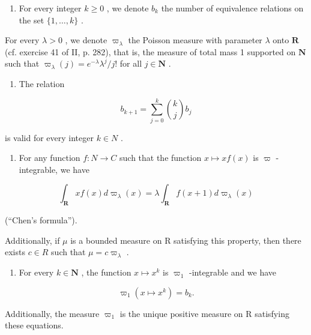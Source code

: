 \begin{enumerate}
\def\labelenumi{\arabic{enumi})}
\setcounter{enumi}{27}
\tightlist
\item
  For every integer \(k \geqslant 0\) , we denote \(b_k\) the number of equivalence relations on the set \(\{1, \ldots, k\}\) .
\end{enumerate}

For every \(\lambda > 0\) , we denote \(\varpi_{\lambda}\) the Poisson measure with parameter \(\lambda\) onto \(\mathbf{R}\) (cf. exercise 41 of II, p. 282), that is, the measure of total mass 1 supported on \(\mathbf{N}\) such that \(\varpi_{\lambda}(j) = e^{-\lambda} \lambda^{j} / j!\) for all \(j \in \mathbf{N}\) .

\begin{enumerate}
\def\labelenumi{\alph{enumi})}
\tightlist
\item
  The relation
\end{enumerate}

\[
b _ {k + 1} = \sum_ {j = 0} ^ {k} {\binom {k} {j}} b _ {j}
\]

is valid for every integer \(k \in N\) .

\begin{enumerate}
\def\labelenumi{\alph{enumi})}
\setcounter{enumi}{1}
\tightlist
\item
  For any function \(f: N \to C\) such that the function \(x \mapsto xf(x)\) is \(\varpi\) -integrable, we have
\end{enumerate}

\[
\int_ {\mathbf {R}} x f (x) d \varpi_ {\lambda} (x) = \lambda \int_ {\mathbf {R}} f (x + 1) d \varpi_ {\lambda} (x)
\]

(“Chen’s formula”).

Additionally, if \(\mu\) is a bounded measure on R satisfying this property, then there exists \(c \in R\) such that \(\mu = c\varpi_{\lambda}\) .

\begin{enumerate}
\def\labelenumi{\alph{enumi})}
\setcounter{enumi}{2}
\tightlist
\item
  For every \(k \in \mathbf{N}\) , the function \(x \mapsto x^k\) is \(\varpi_1\) -integrable and we have
\end{enumerate}

\[
\varpi_ {1} (x \mapsto x ^ {k}) = b _ {k}.
\]

Additionally, the measure \(\varpi_{1}\) is the unique positive measure on R satisfying these equations.

